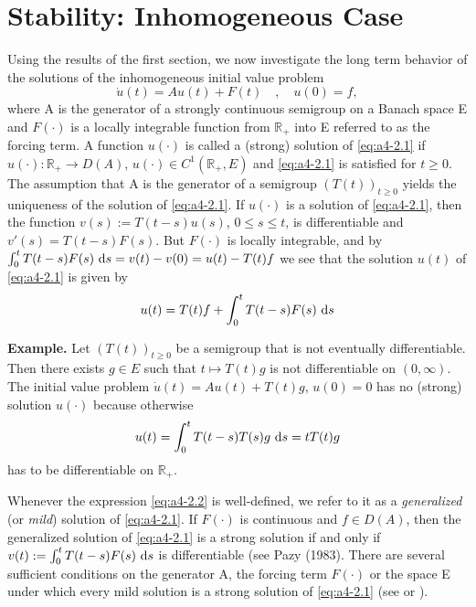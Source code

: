 \section{Stability: Inhomogeneous Case}
Using the results of the first section, we now investigate the long
term behavior of the solutions of the inhomogeneous initial value
problem
\begin{equation}\label{eq:a4-2.1}
\dot{u}(t) = Au(t) + F(t) \quad , \quad u(0) = f,
\end{equation}
where A is the generator of a strongly continuous semigroup on a
Banach space E and $F(\cdot)$ is a locally integrable function from $\mathbb{R}_{+}$
into E referred to as the forcing term. 
A function $u(\cdot)$ is called a (strong)
solution of \eqref{eq:a4-2.1} if $u(\cdot) \colon \mathbb{R}_{+} \to D(A)$, $u(\cdot) \in C^{1}(\mathbb{R}_{+},E)$ and \eqref{eq:a4-2.1} is satisfied for $t \geq 0$.
The assumption that A is the generator of a semigroup $(T(t))_{t \geq 0}$
yields the uniqueness of the solution of \eqref{eq:a4-2.1}. 
If $u(\cdot)$ is a solution of \eqref{eq:a4-2.1}, then the function $v(s) := T(t-s)u(s)$, $0 \leq s \leq t$, is
differentiable and $v'(s) = T(t-s)F(s)$. 
But $F(\cdot)$ is locally integrable, and by $\int_{0}^{t} T(t-s)F(s) \,\mathop{}\!\mathrm{d}{s} = v(t) - v(0) = u(t) - T(t)f$ we see
that the solution $u(t)$ of \eqref{eq:a4-2.1} is given by
\begin{equation}\label{eq:a4-2.2}
u(t) = T(t)f + \int_{0}^{t} T(t-s)F(s) \,\mathop{}\!\mathrm{d}{s}
\end{equation}


{\bf Example.} \label{ex:a4-2.1}
Let $(T(t))_{t \geq 0}$ be a semigroup that is not eventually differentiable. 
Then there
exists $g \in E$ such that $t \mapsto T(t)g$ is not differentiable on $(0,\infty)$.
The initial value problem $\dot{u}(t) = Au(t) + T(t)g$, $u(0) = 0$ has no
(strong) solution $u(\cdot)$ because otherwise
\begin{align*}
u(t) = \int_{0}^{t} T(t-s)T(s)g \,\mathop{}\!\mathrm{d}{s} = tT(t)g
\end{align*}
has to be differentiable on $\mathbb{R}_{+}$.


Whenever the expression \eqref{eq:a4-2.2} is well-defined, we refer to it as a  \emph{generalized} (or
\emph{mild}) solution of \eqref{eq:a4-2.1}. 
If $F(\cdot)$ is continuous and $f \in D(A)$, then
the generalized solution of \eqref{eq:a4-2.1} is a strong solution if and only if
$v(t) := \int_{0}^{t} T(t-s)F(s) \,\mathop{}\!\mathrm{d}{s}$ is differentiable (see \citet[Chap.4,2.4]{pazy:1983}Pazy (1983). 
There are several sufficient conditions on the generator A,
the forcing term $F(\cdot)$ or the space E under which every mild solution
is a strong solution of \eqref{eq:a4-2.1} (see \citet{travis:1979}
or  \citet[Sec.4.2]{pazy:1983}).

